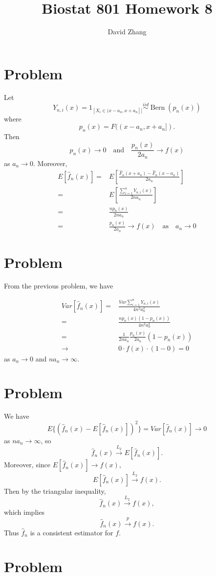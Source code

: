 \documentclass{article}
\title{Biostat 801 Homework 8}
\author{David Zhang}
\newcommand{\hf}{\hat{f}}
\newcommand{\hF}{\hat{F}}
\newcommand{\Bern}{\operatorname{Bern}}
\newcommand{\ltwo}{\overset{L_2}{\to}}
\newcommand{\pto}{\overset{p}{\to}}
\newcommand{\iid}{\overset{iid}{\sim}}
\begin{document}
\maketitle

\section{Problem}

Let
\[
  Y_{n,i}(x) = 1_{[X_i \in (x - a_n, x+a_n]]} \iid \Bern(p_n(x))
\]
where
\[
  p_n(x) = F((x - a_n, x+a_n]).
\]
Then
\[
  p_n(x) \to 0 \quad\text{and}\quad \frac{p_n(x)}{2a_n} \to f(x)
\]
as $a_n \to 0$.
Moreover,
\begin{align*}
  E[\hf_n(x)]
  = & E \left[ \frac{\hF_n(x+a_n) - \hF_n(x-a_n)}{2a_n} \right]
  \\ = & E \left[\frac{\sum_{i=1}^n Y_{n,i}(x)}{2na_n} \right]
  \\ = & \frac{n p_n(x)}{2na_n}
  \\ = & \frac{p_n(x)}{2a_n}
         \to f(x) \quad\text{as}\quad a_n \to 0
\end{align*}

\section{Problem}

From the previous problem, we have

\begin{align*}
Var[\hf_n(x)] = & \frac{Var \sum_{i=1}^n Y_{n,i}(x)}{4n^2a_n^2} 
  \\ = & \frac{n p_n(x)(1 - p_n(x))}{4n^2a_n^2}
  \\ = & \frac{1}{2na_n}\frac{p_n(x)}{2a_n} (1 - p_n(x))
         \\ \to & 0 \cdot f(x) \cdot (1 - 0) = 0
\end{align*}
as $a_n \to 0$ and $na_n \to \infty$.

\section{Problem}
We have
\[
  E\{(\hf_n(x) - E[\hf_n(x)])^2\} = Var[\hf_n(x)] \to 0
\]
as $na_n \to \infty$, so
\[
  \hf_n(x) \ltwo E[\hf_n(x)].
\]
Moreover, since $E[\hf_n(x)] \to f(x)$,
\[
  E[\hf_n(x)] \ltwo f(x).
\]
Then by the triangular inequality,
\[
  \hf_n(x) \ltwo f(x),
\]
which implies
\[
  \hf_n(x) \pto f(x).
\]
Thus $\hf_n$ is a consistent estimator for $f$.

\section{Problem}
\end{document}
